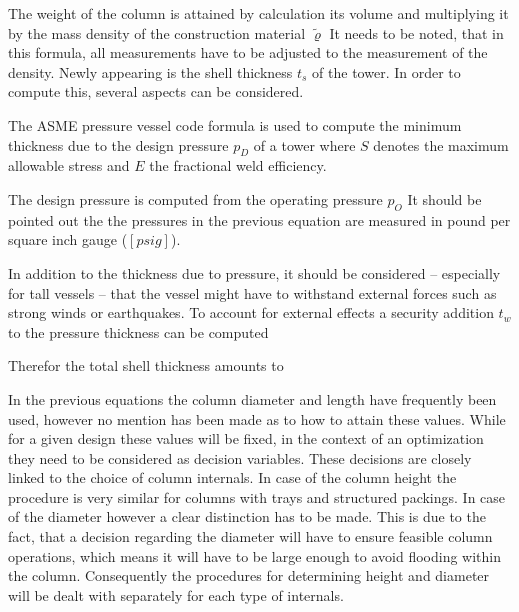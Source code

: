     The weight of the column is attained by calculation its volume and multiplying it by the 
    mass density of the construction material $\tilde{\varrho}$
    It needs to be noted, that in this formula, all measurements have to be adjusted to the measurement 
    of the density. Newly appearing is the shell thickness $t_s$ of the tower. In order to compute 
    this, several aspects can be considered. 
    
    The ASME pressure vessel code formula is used to compute the minimum thickness due to the design 
    pressure $p_D$ of a tower
    where $S$ denotes the maximum allowable stress and $E$ the fractional weld efficiency. 
    
    The design pressure is computed from the operating pressure $p_O$
    It should be pointed out the the pressures in the previous equation are measured in pound per square inch 
    gauge ($[psig]$). 
    
    In addition to the thickness due to pressure, it should be considered -- especially for tall vessels -- 
    that the vessel might have to withstand external forces such as strong winds or earthquakes. 
    To account for external effects a security addition  $t_w$ to the pressure thickness can be computed 
    
    Therefor the total shell thickness amounts to 
    
    In the previous equations the column diameter and length have frequently been used, however no mention 
    has been made as to how to attain these values. While for a given design these values will be fixed, 
    in the context of an optimization they need to be considered as decision variables. These decisions 
    are closely linked to the choice of column internals. In case of the column height the procedure 
    is very similar for columns with trays and structured packings. In case of the diameter however 
    a clear distinction has to be made. This is due to the fact, that a decision regarding the diameter 
    will have to ensure feasible column operations, which means it will have to be large enough to 
    avoid flooding within the column. Consequently the procedures for determining height and diameter 
    will be dealt with separately for each type of internals. 
    
